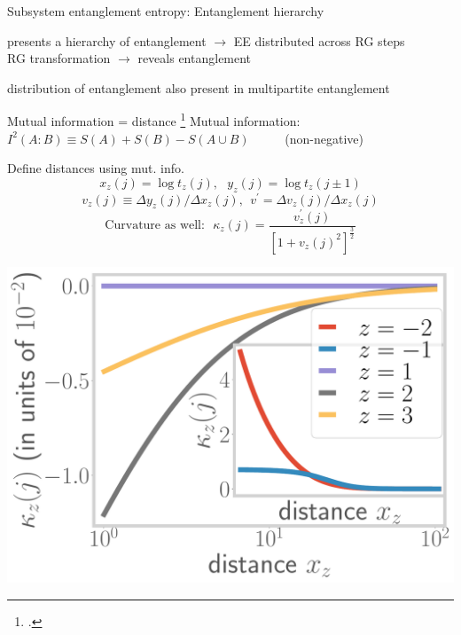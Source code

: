 \documentclass[8pt,aspectratio=169]{beamer}
\begin{document}
\begin{frame}{Subsystem entanglement entropy: Entanglement hierarchy}
\vspace*{\fill}

\begin{itemize}
	\nitem 
presents a \alert{hierarchy} of entanglement \(\longrightarrow\) EE distributed across RG steps\\
RG transformation \(\longrightarrow\) reveals entanglement

\vspace*{\fill}
\nitem distribution of entanglement also present in \alert{multipartite} entanglement
\end{itemize}

\end{frame}

\begin{frame}{Mutual information = distance}
\footcite{van2010building,lee2016,anirban_mott_2022,lee2010,lee2014,qi2013,lee2016,anirbanurg1,anirbanurg2,ryu2006,ryu2006aspects,nozaki2012}
\alert{Mutual information}: ~ \(I^2(A:B) \equiv S(A) + S(B) - S(A \cup B)\) ~ ~ ~ (non-negative)\\[10pt]

	\begin{minipage}{0.5\textwidth}
	Define distances using mut. info.
	\[x_z(j) = \log t_z(j),~ ~ ~y_z(j) = \log t_z(j \pm 1)\]
	\[v_z(j) \equiv \Delta y_z(j)/\Delta x_z(j), ~~ v^\prime = \Delta v_z(j)/\Delta x_z(j)\]
	\[\text{Curvature as well:} ~ ~ ~\kappa_{z}(j) = \frac{v^\prime_z(j)}{\left[1 + v_z(j)^2\right]^\frac{3}{2}}\]
	\end{minipage}
	\begin{minipage}{0.49\textwidth}
		\includegraphics[width=\textwidth]{curvature-pos.pdf}
	\end{minipage}
\end{frame}
\end{document}

